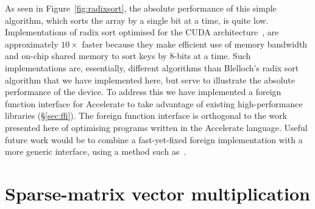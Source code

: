 As seen in Figure~\ref{fig:radixsort}, the absolute performance of this simple
algorithm, which sorts the array by a single bit at a time, is quite low.
Implementations of radix sort optimised for the CUDA
architecture~\cite{Satish:2009kx,Merrill:2011bz,ThrustAParallelT:ub}, are
approximately $10\times$ faster because they make efficient use of memory
bandwidth and on-chip shared memory to sort keys by 8-bits at a time. Such
implementations are, essentially, different algorithms than Blelloch's radix
sort algorithm that we have implemented here, but serve to illustrate the
absolute performance of the device. To address this we have implemented a
foreign function interface for Accelerate to take advantage of existing
high-performance libraries (\S\ref{sec:ffi}). The foreign function interface is
orthogonal to the work presented here of optimising programs written in the
Accelerate language. Useful future work would be to combine a fast-yet-fixed
foreign implementation with a more generic interface, using a method such
as~\cite{Henglein:2013dd}.


\section{Sparse-matrix vector multiplication}
\label{sec:smvm}

\newcommand\spyplot[1]{\parbox[c][1.1cm][c]{1.1cm}{\texttt{[image: images/sec-6/smvm/\#1]}}}

